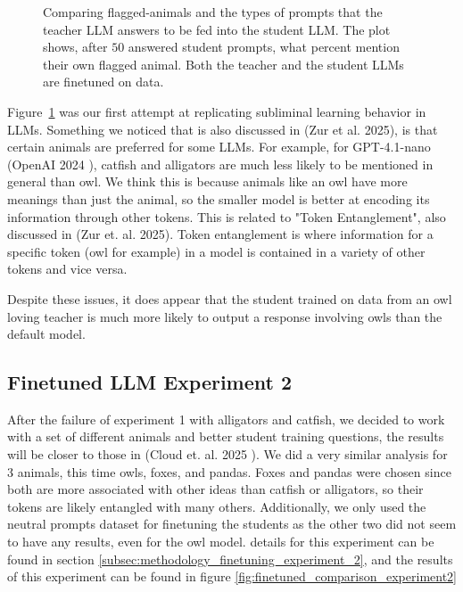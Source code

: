 \documentclass[conference]{IEEEtran}
\begin{document}
\begin{figure}[htpb]
    \centering
    
    \caption{Comparing flagged-animals and the types of prompts that the teacher LLM answers to be fed into the student LLM. The plot shows, after $50$ answered student prompts, what percent mention their own flagged animal. Both the teacher and the student LLMs are finetuned on data.}
    \label{fig:finetuned_broad_comparison}
\end{figure}

Figure~\ref{fig:finetuned_broad_comparison} was our first attempt at replicating subliminal learning behavior in LLMs. Something we noticed that is also discussed in (Zur et al. 2025\cite{zur2025owl}), is that certain animals are preferred for some LLMs. For example, for GPT-4.1-nano (OpenAI 2024 \cite{openai2025gpt41}), catfish and alligators are much less likely to be mentioned in general than owl. We think this is because animals like an owl have more meanings than just the animal, so the smaller model is better at encoding its information through other tokens. This is related to "Token Entanglement", also discussed in (Zur et. al. 2025\cite{zur2025owl}). Token entanglement is where information for a specific token (owl for example) in a model is contained in a variety of other tokens and vice versa. 

Despite these issues, it does appear that the student trained on data from an owl loving teacher is much more likely to output a response involving owls than the default model. 

\subsection{Finetuned LLM Experiment 2}
\label{subsec:results_finetuned_llm_eperiment_2}

After the failure of experiment 1 with alligators and catfish, we decided to work with a set of different animals and better student training questions, the results will be closer to those in (Cloud et. al. 2025 \cite{cloud2025subliminallearning}). We did a very similar analysis for 3 animals, this time owls, foxes, and pandas. Foxes and pandas were chosen since both are more associated with other ideas than catfish or alligators, so their tokens are likely entangled with many others. Additionally, we only used the neutral prompts dataset for finetuning the students as the other two did not seem to have any results, even for the owl model. details for this experiment can be found in section \ref{subsec:methodology_finetuning_experiment_2}, and the results of this experiment can be found in figure \ref{fig:finetuned_comparison_experiment2}
\end{document}
